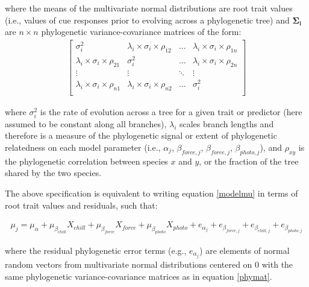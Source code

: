 \documentclass[11pt]{article}
\begin{document}
\noindent where the means of the multivariate normal distributions are root trait values (i.e., values of cue responses prior to evolving across a phylogenetic tree) and $\boldsymbol{\Sigma_i}$ are $n \times n$ phylogenetic variance-covariance matrices of the form: \\ 
\begin{align}
  \label{phymat}
\begin{bmatrix}
  \sigma^2_i & \lambda_i \times \sigma_{i} \times \rho_{12} & \ldots & \lambda_i \times \sigma_{i} \times \rho_{1n} \\
  \lambda_i \times \sigma_i \times \rho_{21} & \sigma^2_i & \ldots & \lambda_i \times \sigma_{i} \times \rho_{2n} \\
  \vdots & \vdots & \ddots & \vdots \\
  \lambda_i \times \sigma_i \times \rho_{n1} & \lambda_i \times \sigma_i \times \rho_{n2} & \ldots & \sigma^2_i \\
\end{bmatrix}
\end{align}

\noindent where $\sigma_i^2$ is the rate of evolution across a tree for a given trait or predictor (here assumed to be constant along all branches), $\lambda_i$ scales branch lengths and therefore is a measure of the phylogenetic signal or extent of phylogenetic relatedness on each model parameter (i.e., $\alpha_{j}$, $\beta_{force,j}$, $\beta_{force,j}$, $\beta_{photo,j}$), and $\rho_{xy}$ is the phylogenetic correlation between species $x$ and $y$, or the fraction of the tree shared by the two species.

The above specification is equivalent to writing equation \ref{modelmu} in terms of root trait values and residuals, such that:

\begin{align}
  \label{eqfive}
  \mu_j = \mu_\alpha + \mu_{\beta_{chill}} X_{chill} + \mu_{\beta_{force}} X_{force} + \mu_{\beta_{photo}} X_{photo} + e_{\alpha_{j}} + e_{\beta_{force,j}} + e_{\beta_{chill,j}} + e_{\beta_{photo,j}}
\end{align}

\noindent where the residual phylogenetic error terms (e.g., $e_{\alpha_{j}}$) are elements of normal random vectors from multivariate normal distributions centered on $0$ with the same phylogenetic variance-covariance matrices as in equation \ref{phymat}. 



\end{document}
